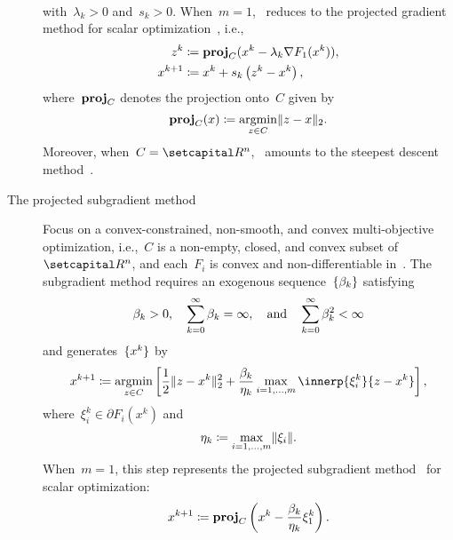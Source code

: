 \documentclass[../../main]{subfiles}
\begin{document}
\begin{example}
\begin{description}
\begin{equation}
\begin{aligned}
                \end{aligned}
            \end{equation} 
            with~$\lambda_k > 0$ and~$s_k > 0$.
            When~$m = 1$,~ reduces to the projected gradient method for scalar optimization~\cite{Polyak1963,Goldstein1964,Goldstein1967,McCormick1969}, i.e.,
            \begin{equation}
                \begin{aligned}
                    z^k &\coloneqq \operatorname{\mathbf{proj}}_C (x^k - \lambda_k \nabla F_1(x^k)), \\
                    x^{k + 1} &\coloneqq x^k + s_k \left( z^k - x^k \right)
                ,\end{aligned}
            \end{equation} 
            where~$\operatorname{\mathbf{proj}}_C$ denotes the projection onto~$C$ given by
            \begin{equation} \label{eq:proj}
                \operatorname{\mathbf{proj}}_C(x) \coloneqq \operatorname*{argmin}_{z \in C} \lVert z - x\rVert_2
            .\end{equation} 
            Moreover, when~$C = \setR^n$,~ amounts to the steepest descent method~.
        \item[The projected subgradient method~\cite{Bello-Cruz2013}]
            Focus on a convex-constrained, non-smooth, and convex multi-objective optimization, i.e.,~$C$ is a non-empty, closed, and convex subset of~$\setR^n$, and each~$F_i$ is convex and non-differentiable in~.
            The subgradient method requires an exogenous sequence~$\lbrace\beta_k\rbrace$ satisfying
            \begin{equation}
                \beta_k > 0, \quad \sum_{k = 0}^{\infty} \beta_k = \infty, \quad \text{and} \quad \sum_{k = 0}^{\infty} \beta_k^2 < \infty 
            \end{equation} 
            and generates~$\lbrace x^k\rbrace$ by
            \begin{equation}
                    x^{k + 1} \coloneqq \argmin_{z \in C} \left[ \frac{1}{2} \norm{z - x^k}_2^2 + \frac{\beta_k}{\eta_k} \max_{i = 1, \dots, m} \innerp{\xi^k_i}{z - x^k} \right] 
            ,\end{equation} 
            where~$\xi^k_i \in \partial F_i(x^k)$ and
            \begin{equation}
                \eta_k \coloneqq \max_{i = 1, \dots, m} \lVert\xi_i\rVert
            .\end{equation} 
            When~$m = 1$, this step represents the projected subgradient method~\cite{Polyak1967,Polyak1969,Shor1985,Alber1998,Alber2001} for scalar optimization:
            \begin{equation}
                x^{k + 1} \coloneqq \operatorname{\mathbf{proj}}_C\left( x^k - \frac{\beta_k}{\eta_k} \xi^k_1 \right) 
            .\end{equation} 
    \end{description}
\end{example}
\end{document}
